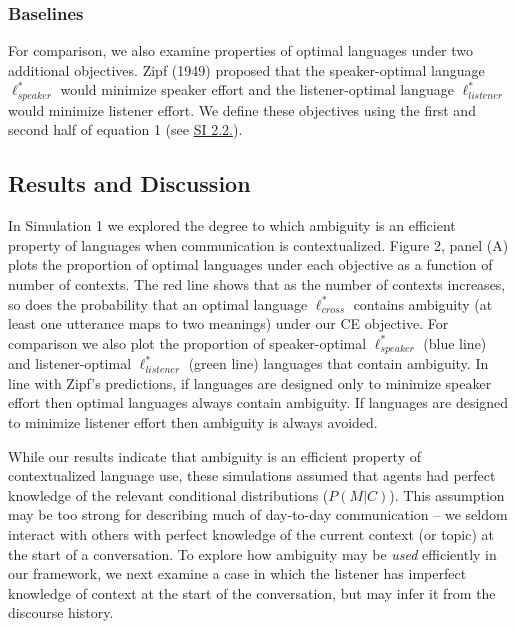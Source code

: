 \documentclass[10pt, letterpaper]{article}
\begin{document}
\subsubsection{Baselines}\label{baselines}

For comparison, we also examine properties of optimal languages under
two additional objectives. Zipf (1949) proposed that the speaker-optimal
language \(\ell_{speaker}^*\) would minimize speaker effort and the
listener-optimal language \(\ell_{listener}^*\) would minimize listener
effort. We define these objectives using the first and second half of
equation 1 (see
\href{https://github.com/benpeloquin7/zipf_principles/blob/master/paper/supplementary_materials.pdf}{SI 2.2.}).\par

\subsection{Results and Discussion}\label{results-and-discussion}

In Simulation 1 we explored the degree to which ambiguity is an
efficient property of languages when communication is contextualized.
Figure 2, panel (A) plots the proportion of optimal languages under each
objective as a function of number of contexts. The red line shows that
as the number of contexts increases, so does the probability that an
optimal language \(\ell^*_{cross}\) contains ambiguity (at least one
utterance maps to two meanings) under our CE objective. For comparison
we also plot the proportion of speaker-optimal \(\ell^*_{speaker}\)
(blue line) and listener-optimal \(\ell^*_{listener}\) (green line)
languages that contain ambiguity. In line with Zipf's predictions, if
languages are designed only to minimize speaker effort then optimal
languages always contain ambiguity. If languages are designed to
minimize listener effort then ambiguity is always avoided.\par

While our results indicate that ambiguity is an efficient property of
contextualized language use, these simulations assumed that agents had
perfect knowledge of the relevant conditional distributions
(\(P(M|C)\)). This assumption may be too strong for describing much of
day-to-day communication -- we seldom interact with others with perfect
knowledge of the current context (or topic) at the start of a
conversation. To explore how ambiguity may be \textit{used} efficiently
in our framework, we next examine a case in which the listener has
imperfect knowledge of context at the start of the conversation, but may
infer it from the discourse history.\par
\end{document}
